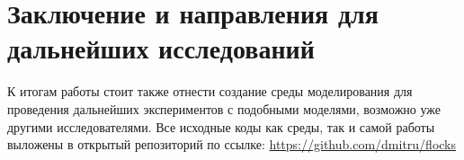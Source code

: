 \chapter{Заключение и направления для дальнейших исследований} \label{conclusion}



К итогам работы стоит также отнести создание среды моделирования для проведения дальнейших экспериментов с подобными моделями, возможно уже другими исследователями. Все исходные коды как среды, так и самой работы выложены в открытый репозиторий по ссылке:
\url{https://github.com/dmitru/flocks}


